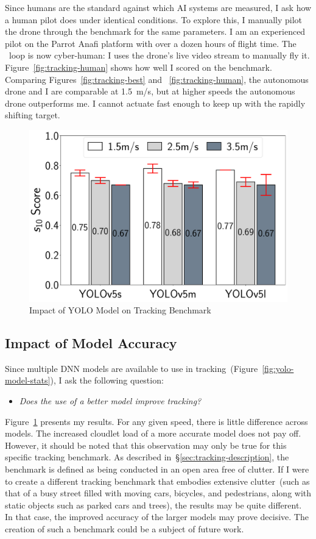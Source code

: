 Since humans are the standard against which AI systems are measured,
I ask how a human pilot does under identical conditions.
To explore this, I manually pilot the drone through the benchmark for the same parameters. I am an experienced pilot on the Parrot Anafi platform with over a dozen hours of flight time. The \ooda~loop is now cyber-human: I uses the drone's live video stream to manually fly it.
Figure~\ref{fig:tracking-human} shows how well I scored
on the benchmark.  Comparing Figures~\ref{fig:tracking-best} and
~\ref{fig:tracking-human}, the autonomous drone and I are comparable at 1.5~m/s, but at higher speeds the autonomous
drone outperforms me. I cannot actuate fast enough to keep up with the rapidly shifting target.

\begin{figure}
\centering
\includegraphics[width=0.8\linewidth]{chapter6/FIGS/fig-tracking-models.pdf}
\caption{\small Impact of YOLO Model on Tracking Benchmark}
\label{fig:track_models}
\end{figure}

\subsection{Impact of Model Accuracy}
\label{sec:tracking-models}

Since multiple DNN models are available to use in
tracking~(Figure~\ref{fig:yolo-model-stats}), I ask the following
question:
\begin{itemize}
\item{\em Does the use of a better model improve tracking?}
\end{itemize}
Figure~\ref{fig:track_models} presents my results.  For any given
speed, there is little difference across models.  The increased
cloudlet load of a more accurate model does not pay off.  However, it
should be noted that this observation may only be true for this
specific tracking benchmark.  As described
in~\S\ref{sec:tracking-description}, the benchmark is defined as being
conducted in an open area free of clutter.  If I were to create a
different tracking benchmark that embodies extensive clutter~(such as
that of a busy street filled with moving cars, bicycles, and
pedestrians, along with static objects such as parked cars and trees),
the results may be quite different. In that case, the improved
accuracy of the larger models may prove decisive. The creation of such a benchmark could be a subject of future work.

